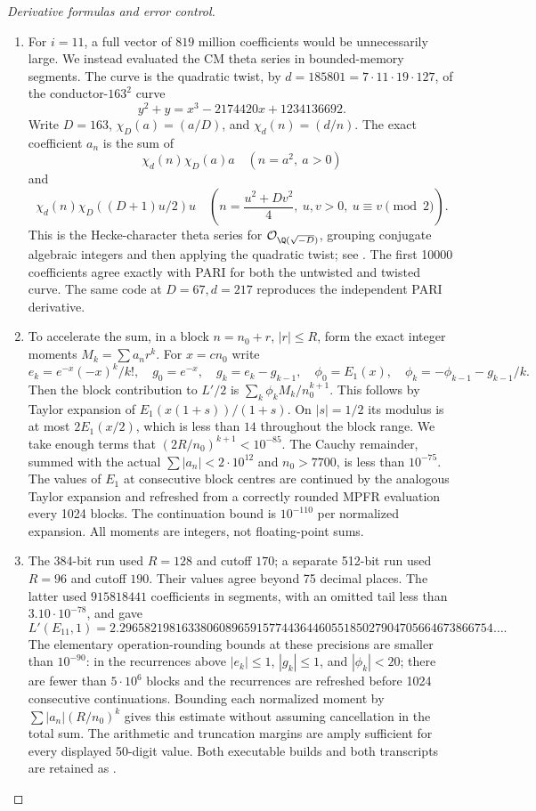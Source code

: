 \begin{proof}[Derivative formulas and error control]
\begin{enumerate}[label=\arabic*.,leftmargin=*]
\item For $i=11$, a full vector of $819$ million coefficients would be
unnecessarily large. We instead evaluated the CM theta series in
bounded-memory segments. The curve is the quadratic twist, by
$d=185801=7\cdot11\cdot19\cdot127$, of the conductor-$163^2$
curve
\[
 y^2+y=x^3-2174420x+1234136692.
\]
Write $D=163$, $\chi_D(a)=(a/D)$, and $\chi_d(n)=(d/n)$.
The exact coefficient $a_n$ is the sum of
\[
 \chi_d(n)\chi_D(a)a \quad(n=a^2,\ a>0)
\]
and
\[
 \chi_d(n)\chi_D((D+1)u/2)u
 \quad\left(n=\frac{u^2+Dv^2}{4},\ u,v>0,
                           \ u\equiv v\pmod2\right).
\]
This is the Hecke-character theta series for
$\mathcal O_{\Q(\sqrt{-D})}$, grouping conjugate algebraic integers
and then applying the quadratic twist; see
\citet[Section 3]{CrDarmon2009}. The first 10000 coefficients agree
exactly with PARI for both the untwisted and twisted curve. The same
code at $D=67,d=217$ reproduces the independent PARI derivative.

\item To accelerate the sum, in a block $n=n_0+r$, $|r|\leq R$, form the
exact integer moments $M_k=\sum a_nr^k$. For $x=cn_0$ write
\[
 e_k=e^{-x}(-x)^k/k!,\quad g_0=e^{-x},\quad
 g_k=e_k-g_{k-1},\quad
 \phi_0=E_1(x),\quad\phi_k=-\phi_{k-1}-g_{k-1}/k.
\]
Then the block contribution to $L'/2$ is
$\sum_k\phi_k M_k/n_0^{k+1}$. This follows by Taylor expansion
of $E_1(x(1+s))/(1+s)$. On $|s|=1/2$ its modulus is at most
$2E_1(x/2)$, which is less than $14$ throughout the block range.
We take enough terms that $(2R/n_0)^{k+1}<10^{-85}$.
The Cauchy remainder, summed with the actual
$\sum|a_n|<2\cdot10^{12}$ and $n_0>7700$, is less than
$10^{-75}$. The values of $E_1$ at consecutive block centres
are continued by the analogous Taylor expansion and refreshed
from a correctly rounded MPFR evaluation every 1024 blocks.
The continuation bound is $10^{-110}$ per normalized expansion.
All moments are integers, not floating-point sums.

\item The 384-bit run used $R=128$ and cutoff $170$; a separate 512-bit
run used $R=96$ and cutoff $190$. Their values agree beyond 75
decimal places. The latter used $915818441$ coefficients in
segments, with an omitted tail less than $3.10\cdot10^{-78}$,
and gave
\[
 L'(E_{11},1)=
 2.296582198163380608965915774436446055185027904705664673866754\ldots.
\]
The elementary operation-rounding bounds at these precisions are
smaller than $10^{-90}$: in the recurrences above
$|e_k|\leq1$, $|g_k|\leq1$, and $|\phi_k|<20$;
there are fewer than $5\cdot10^6$ blocks and the recurrences are
refreshed before 1024 consecutive continuations. Bounding each
normalized moment by $\sum|a_n|(R/n_0)^k$ gives this estimate
without assuming cancellation in the total sum. The arithmetic
and truncation margins are amply sufficient for every displayed
50-digit value. Both executable builds and both transcripts are
retained as .


\end{enumerate}
\end{proof}
